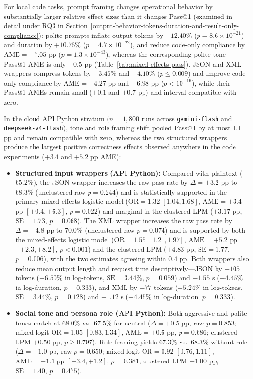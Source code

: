 \documentclass[a4paper,fleqn]{cas-sc}
\providecommand{\tightlist}{%
  \setlength{\itemsep}{0pt}\setlength{\parskip}{0pt}}
\begin{document}
For local code tasks, prompt framing changes operational behavior by substantially larger relative effect sizes than it changes Pass@1 (examined in detail under RQ3 in Section~\ref{output-behavior-tokens-duration-and-result-only-compliance}): polite prompts inflate output tokens by $+12.40\%$ ($p = 8.6 \times 10^{-21}$) and duration by $+10.76\%$ ($p = 4.7 \times 10^{-22}$), and reduce code-only compliance by $\text{AME} = -7.05$ pp ($p = 1.3 \times 10^{-43}$), whereas the corresponding polite-tone Pass@1 AME is only $-0.5$ pp (Table~\ref{tab:mixed-effects-pass}). JSON and XML wrappers compress tokens by $-3.46\%$ and $-4.10\%$ ($p \le 0.009$) and improve code-only compliance by $\text{AME} = +4.27$ pp and $+6.98$ pp ($p < 10^{-16}$), while their Pass@1 AMEs remain small ($+0.1$ and $+0.7$ pp) and interval-compatible with zero.

In the cloud API Python stratum ($n = 1,800$ runs across \texttt{gemini-flash} and \texttt{deepseek-v4-flash}), tone and role framing shift pooled Pass@1 by at most $1.1$ pp and remain compatible with zero, whereas the two structured wrappers produce the largest positive correctness effects observed anywhere in the code experiments ($+3.4$ and $+5.2$ pp AME):
\begin{itemize}
\tightlist
\item \textbf{Structured input wrappers (API Python):} Compared with plaintext ($65.2\%$), the JSON wrapper increases the raw pass rate by $\Delta = +3.2$ pp to $68.3\%$ (unclustered raw $p = 0.244$) and is statistically supported in the primary mixed-effects logistic model ($\text{OR} = 1.32$ $[1.04, 1.68]$, $\text{AME} = +3.4$ pp $[+0.4, +6.3]$, $p = 0.022$) and marginal in the clustered LPM ($+3.17$ pp, $\text{SE} = 1.73$, $p = 0.068$). The XML wrapper increases the raw pass rate by $\Delta = +4.8$ pp to $70.0\%$ (unclustered raw $p = 0.074$) and is supported by both the mixed-effects logistic model ($\text{OR} = 1.55$ $[1.21, 1.97]$, $\text{AME} = +5.2$ pp $[+2.3, +8.2]$, $p < 0.001$) and the clustered LPM ($+4.83$ pp, $\text{SE} = 1.77$, $p = 0.006$), with the two estimates agreeing within $0.4$ pp. Both wrappers also reduce mean output length and request time descriptively—JSON by $-105$ tokens ($-6.50\%$ in log-tokens, $\text{SE} = 3.44\%$, $p = 0.059$) and $-1.55$ s ($-4.45\%$ in log-duration, $p = 0.333$), and XML by $-77$ tokens ($-5.24\%$ in log-tokens, $\text{SE} = 3.44\%$, $p = 0.128$) and $-1.12$ s ($-4.45\%$ in log-duration, $p = 0.333$).
\item \textbf{Social tone and persona role (API Python):} Both aggressive and polite tones match at $68.0\%$ vs.\ $67.5\%$ for neutral ($\Delta = +0.5$ pp, raw $p = 0.853$; mixed-logit $\text{OR} = 1.05$ $[0.83, 1.34]$, $\text{AME} = +0.6$ pp, $p = 0.686$; clustered LPM $+0.50$ pp, $p \ge 0.797$). Role framing yields $67.3\%$ vs.\ $68.3\%$ without role ($\Delta = -1.0$ pp, raw $p = 0.650$; mixed-logit $\text{OR} = 0.92$ $[0.76, 1.11]$, $\text{AME} = -1.1$ pp $[-3.4, +1.2]$, $p = 0.381$; clustered LPM $-1.00$ pp, $\text{SE} = 1.40$, $p = 0.475$).
\end{itemize}
\end{document}
